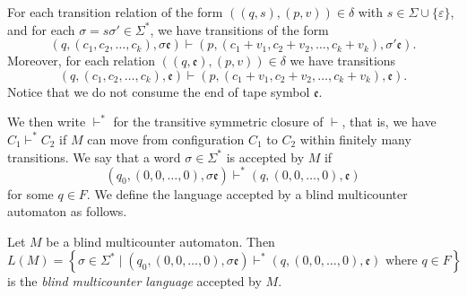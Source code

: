 For each transition relation of the form $((q,s),(p,v)) \in \delta$ with $s \in \Sigma\cup\{\varepsilon\}$, and for each $\sigma = s\sigma' \in \Sigma^*$, we have transitions of the form
\[
	(
		q,(c_1,c_2,\ldots,c_k),\sigma\mathfrak{e}
	)
	\vdash
	(
		p,(c_1+v_1,c_2+v_2,\ldots,c_k+v_k),\sigma'\mathfrak{e}
	).
\]
Moreover, for each relation $((q,\mathfrak{e}),(p,v)) \in \delta$ we have transitions
\[
	(
		q,(c_1,c_2,\ldots,c_k),\mathfrak{e}
	)
	\vdash
	(
		p,(c_1+v_1,c_2+v_2,\ldots,c_k+v_k),\mathfrak{e}
	).
\]
Notice that we do not consume the end of tape symbol $\mathfrak{e}$.

We then write $\vdash^*$ for the transitive symmetric closure of $\vdash$, that is, we have $C_1 \vdash^* C_2$ if $M$ can move from configuration $C_1$ to $C_2$ within finitely many transitions.
We say that a word $\sigma \in \Sigma^*$ is accepted by $M$ if
\[
	(q_0,(0,0,\ldots,0),\sigma\mathfrak{e})
	\vdash^*
	(q,(0,0,\ldots,0),\mathfrak{e})
\]
for some $q \in F$.
We define the language accepted by a blind multicounter automaton as follows.

\begin{definition}\label{defn:blind-multicounter}
Let $M$ be a blind multicounter automaton.
Then
\[
	L(M)
	=
	\left\{
		\sigma \in \Sigma^*
	\mid
			(q_0,(0,0,\ldots,0),\sigma\mathfrak{e})
			\vdash^*
			(q,(0,0,\ldots,0),\mathfrak{e})
		\text{ where }
			q \in F
	\right\}
\]
is the \emph{blind multicounter language} accepted by $M$.
\end{definition}


